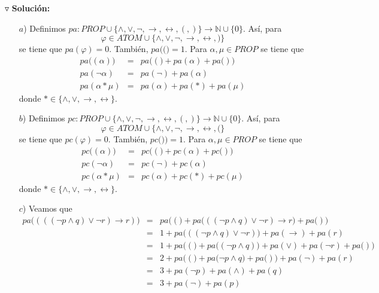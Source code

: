 \documentclass{article}
\begin{document}
$\triangledown$ \textbf{Solución:}
\begin{itemize}
  \item[$a$)] Definimos $pa: PROP \cup \{\land, \lor, \neg, \rightarrow, \leftrightarrow, (, )\} \rightarrow \mathbb{N} \cup \{0\}$.
  Así, para
  \[
  \varphi \in ATOM \cup \{\land, \lor, \neg, \rightarrow, \leftrightarrow, )\}
  \]
  se tiene que $pa(\varphi) = 0$. También, $pa\big((\big) = 1$. Para $\alpha, \mu \in PROP$ se tiene que
  \begin{eqnarray*}
    pa\big((\alpha)\big) &=& pa\big((\big) + pa(\alpha) + pa\big()\big)\\
    pa(\neg \alpha) &=& pa(\neg) + pa(\alpha)\\
    pa(\alpha * \mu) &=& pa(\alpha) + pa(*) + pa(\mu)
  \end{eqnarray*}
  donde $* \in \{\land, \lor, \rightarrow, \leftrightarrow\}$.
\item[$b$)] Definimos $pc: PROP \cup \{\land, \lor, \neg, \rightarrow, \leftrightarrow, (, )\} \rightarrow \mathbb{N} \cup \{0\}$.
  Así, para
  \[
  \varphi \in ATOM \cup \{\land, \lor, \neg, \rightarrow, \leftrightarrow, (\}
  \]
  se tiene que $pc(\varphi) = 0$. También, $pc\big()\big) = 1$. Para $\alpha, \mu \in PROP$ se tiene que
  \begin{eqnarray*}
    pc\big((\alpha)\big) &=& pc\big((\big) + pc(\alpha) + pc\big()\big)\\
    pc(\neg \alpha) &=& pc(\neg) + pc(\alpha)\\
    pc(\alpha * \mu) &=& pc(\alpha) + pc(*) + pc(\mu)    
  \end{eqnarray*}
  donde $* \in \{\land, \lor, \rightarrow, \leftrightarrow\}$.
\item[$c$)] Veamos que
  \begin{eqnarray*}
    pa\big((((\neg p \land q) \lor \neg r) \rightarrow r)\big)  &=&
    pa\big((\big) + pa\big(((\neg p \land q) \lor \neg r) \rightarrow r\big) + pa\big()\big)\\
    &=& 1 + pa\big(((\neg p \land q)\lor \neg r)\big) + pa(\rightarrow) + pa(r)\\
    &=& 1 + pa\big((\big) + pa\big((\neg p \land q)\big) + pa(\lor) + pa(\neg r) + pa\big()\big)\\
    &=& 2 + pa\big((\big) + pa\big(\neg p \land q\big) + pa\big()\big) + pa(\neg) + pa(r)\\
    &=& 3 + pa(\neg p) + pa(\land) + pa(q)\\
    &=& 3 + pa(\neg) + pa(p)\\

\end{eqnarray*}
\end{itemize}
\end{document}
